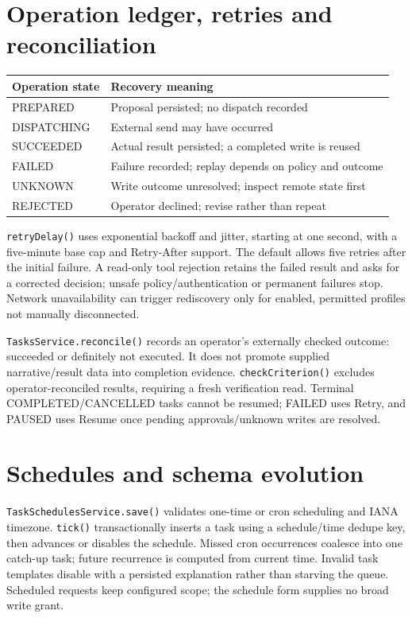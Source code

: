 \section{Operation ledger, retries and reconciliation}
\par\smallskip\noindent\begin{tabularx}{\linewidth}{@{}lX@{}}\toprule
Operation state & Recovery meaning\\\midrule
PREPARED & Proposal persisted; no dispatch recorded\\
DISPATCHING & External send may have occurred\\
SUCCEEDED & Actual result persisted; a completed write is reused\\
FAILED & Failure recorded; replay depends on policy and outcome\\
UNKNOWN & Write outcome unresolved; inspect remote state first\\
REJECTED & Operator declined; revise rather than repeat\\\bottomrule
\end{tabularx}\par\smallskip
\texttt{retryDelay()} uses exponential backoff and jitter, starting at one second, with a five-minute base cap and Retry-After support. The default allows five retries after the initial failure. A read-only tool rejection retains the failed result and asks for a corrected decision; unsafe policy/authentication or permanent failures stop. Network unavailability can trigger rediscovery only for enabled, permitted profiles not manually disconnected.

\texttt{TasksService.reconcile()} records an operator's externally checked outcome: succeeded or definitely not executed. It does not promote supplied narrative/result data into completion evidence. \texttt{checkCriterion()} excludes operator-reconciled results, requiring a fresh verification read. Terminal COMPLETED/CANCELLED tasks cannot be resumed; FAILED uses Retry, and PAUSED uses Resume once pending approvals/unknown writes are resolved.
\section{Schedules and schema evolution}
\texttt{TaskSchedulesService.save()} validates one-time or cron scheduling and IANA timezone. \texttt{tick()} transactionally inserts a task using a schedule/time dedupe key, then advances or disables the schedule. Missed cron occurrences coalesce into one catch-up task; future recurrence is computed from current time. Invalid task templates disable with a persisted explanation rather than starving the queue. Scheduled requests keep configured scope; the schedule form supplies no broad write grant.

